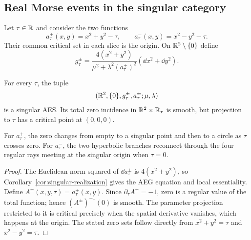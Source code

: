 \subsection{Real Morse events in the singular category}

Let $\tau\in\mathbb{R}$ and consider the two functions
\begin{equation}
 a^+_\tau(x,y)=x^2+y^2-\tau,
 \qquad
 a^-_\tau(x,y)=x^2-y^2-\tau.
 \label{eq:morse-assignments}
\end{equation}
Their common critical set in each slice is the origin.  On
$\mathbb{R}^2\setminus\{0\}$ define
\begin{equation}
 g^\pm_\tau=
 \frac{4(x^2+y^2)}
 {\mu^2+\lambda^2(a^\pm_\tau)^2}
 (\dd x^2+\dd y^2).
 \label{eq:morse-aeg-metric}
\end{equation}

\begin{proposition}
\label{prop:aeg-morse-bifurcations}
For every $\tau$, the tuple
\[
 (\mathbb{R}^2,\{0\},g^\pm_\tau,a^\pm_\tau;\mu,\lambda)
\]
is a singular AES.  Its total zero incidence in $\mathbb{R}^2\times\mathbb{R}_\tau$ is smooth,
but projection to $\tau$ has a critical point at $(0,0,0)$.

For $a^+_\tau$, the zero changes from empty to a singular point and then to a
circle as $\tau$ crosses zero.  For $a^-_\tau$, the two hyperbolic branches
reconnect through the four regular rays meeting at the singular origin when
$\tau=0$.
\end{proposition}

\begin{proof}
The Euclidean norm squared of $\dd a^\pm_\tau$ is $4(x^2+y^2)$, so
Corollary~\ref{cor:singular-realization} gives the AEG equation and local
essentiality.  Define
$A^\pm(x,y,\tau)=a^\pm_\tau(x,y)$.  Since
$\partial_\tau A^\pm=-1$, zero is a regular value of the total function; hence
$(A^\pm)^{-1}(0)$ is smooth.  The parameter projection restricted to it is
critical precisely when the spatial derivative vanishes, which happens at the
origin.  The stated zero sets follow directly from
$x^2+y^2=\tau$ and $x^2-y^2=\tau$.
\end{proof}

